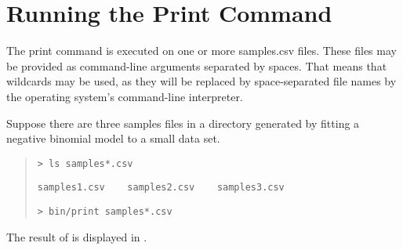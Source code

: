 \section{Running the Print Command}

The print command is executed on one or more samples.csv files.  These
files may be provided as command-line arguments separated by spaces.
That means that wildcards may be used, as they will be replaced by
space-separated file names by the operating system's command-line
interpreter. 

Suppose there are three samples files in a directory generated by
fitting a negative binomial model to a small data set.
%
\begin{quote}
\begin{Verbatim}[fontshape=sl]
> ls samples*.csv
\end{Verbatim}
%
\begin{Verbatim}
samples1.csv	samples2.csv	samples3.csv
\end{Verbatim}
%
\begin{Verbatim}[fontshape=sl]
> bin/print samples*.csv
\end{Verbatim}
\end{quote}
%
The result of  is displayed in .
%
